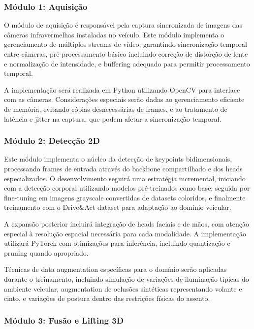 \documentclass[12pt, a4paper]{article}
\begin{document}
\subsubsection{Módulo 1: Aquisição}

O módulo de aquisição é responsável pela captura sincronizada de imagens das câmeras infravermelhas instaladas no veículo. Este módulo implementa o gerenciamento de múltiplos streams de vídeo, garantindo sincronização temporal entre câmeras, pré-processamento básico incluindo correção de distorção de lente e normalização de intensidade, e buffering adequado para permitir processamento temporal.

A implementação será realizada em Python utilizando OpenCV para interface com as câmeras. Considerações especiais serão dadas ao gerenciamento eficiente de memória, evitando cópias desnecessárias de frames, e ao tratamento de latência e jitter na captura, que podem afetar a sincronização temporal.

\subsubsection{Módulo 2: Detecção 2D}

Este módulo implementa o núcleo da detecção de keypoints bidimensionais, processando frames de entrada através do backbone compartilhado e dos heads especializados. O desenvolvimento seguirá uma estratégia incremental, iniciando com a detecção corporal utilizando modelos pré-treinados como base, seguida por fine-tuning em imagens grayscale convertidas de datasets coloridos, e finalmente treinamento com o Drive\&Act dataset para adaptação ao domínio veicular.

A expansão posterior incluirá integração de heads faciais e de mãos, com atenção especial à resolução espacial necessária para cada modalidade. A implementação utilizará PyTorch com otimizações para inferência, incluindo quantização e pruning quando apropriado.

Técnicas de data augmentation específicas para o domínio serão aplicadas durante o treinamento, incluindo simulação de variações de iluminação típicas do ambiente veicular, augmentation de oclusões sintéticas representando volante e cinto, e variações de postura dentro das restrições físicas do assento.

\subsubsection{Módulo 3: Fusão e Lifting 3D}
\end{document}
